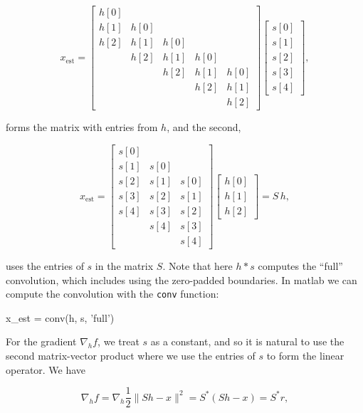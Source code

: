 \documentclass[journal]{IEEEtran}
\begin{document}
\[ x_\text{est} = \begin{bmatrix} h[0]\\h[1]&h[0]\\h[2]&h[1]&h[0]\\&h[2]&h[1]&h[0]\\&&h[2]&h[1]&h[0]\\&&&h[2]&h[1]\\&&&&h[2]\end{bmatrix}\begin{bmatrix}s[0]\\s[1]\\s[2]\\s[3]\\s[4]\end{bmatrix}, \] 

\noindent forms the matrix with entries from $h$, and the second,

\[ x_\text{est} = \begin{bmatrix} s[0]\\s[1]&s[0]\\s[2]&s[1]&s[0]\\s[3]&s[2]&s[1]\\s[4]&s[3]&s[2]\\&s[4]&s[3]\\&&s[4]\end{bmatrix}\begin{bmatrix}h[0]\\h[1]\\h[2]\end{bmatrix}
= S\, h, \] 

\noindent uses the entries of $s$ in the matrix $S$.  Note that here $h\ast s$ computes the ``full'' convolution, which includes using the zero-padded boundaries.  In {\sc matlab} we can compute the convolution with the \verb|conv| function:

\begin{verb}
  x_est = conv(h, s, 'full')
\end{verb}

For the gradient $\nabla_hf$, we treat $s$ as a constant, and so it is natural to use the second matrix-vector product where we use the entries of $s$ to form the linear operator.  We have

\[ \nabla_hf = \nabla_h\frac{1}{2}\|Sh-x\|^2 = S^\ast(Sh-x) = S^\ast r, \] 
\end{document}
